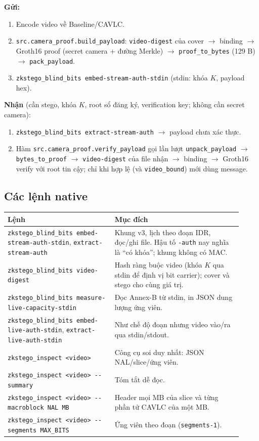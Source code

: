 \documentclass[11pt,a4paper]{article}
\begin{document}
\textbf{Gửi:}
\begin{enumerate}[leftmargin=*]
  \item Encode video về Baseline/CAVLC.
  \item \texttt{src.camera\_proof.build\_payload}: \texttt{video-digest} của cover
  \(\rightarrow\) binding \(\rightarrow\) Groth16 proof (secret camera + đường Merkle)
  \(\rightarrow\) \texttt{proof\_to\_bytes} (129 B) \(\rightarrow\) \texttt{pack\_payload}.
  \item \texttt{zkstego\_blind\_bits embed-stream-auth-stdin} (stdin: khóa \(K\), payload hex).
\end{enumerate}

\textbf{Nhận} (cần stego, khóa \(K\), root sổ đăng ký, verification key; không cần secret camera):
\begin{enumerate}[leftmargin=*]
  \item \texttt{zkstego\_blind\_bits extract-stream-auth} \(\rightarrow\) payload chưa xác thực.
  \item Hàm \texttt{src.camera\_proof.verify\_payload} gọi lần lượt
  \texttt{unpack\_payload} \(\rightarrow\) \texttt{bytes\_to\_proof} \(\rightarrow\) \texttt{video-digest} của file nhận
  \(\rightarrow\) binding \(\rightarrow\) Groth16 verify với root tin cậy; chỉ khi hợp lệ
  (và \texttt{video\_bound}) mới dùng message.
\end{enumerate}

\subsection{Các lệnh native}

\begin{center}
\small
\begin{tabular}{p{0.42\linewidth}p{0.50\linewidth}}
\toprule
Lệnh & Mục đích \\
\midrule
\texttt{zkstego\_blind\_bits embed-stream-auth-stdin}, \texttt{extract-stream-auth} & Khung v3, lịch theo đoạn IDR, đọc/ghi file. Hậu tố \texttt{-auth} nay nghĩa là ``có khóa''; khung không có MAC. \\
\texttt{zkstego\_blind\_bits video-digest} & Hash ràng buộc video (khóa \(K\) qua stdin để định vị bit carrier); cover và stego cho cùng giá trị. \\
\texttt{zkstego\_blind\_bits measure-live-capacity-stdin} & Đọc Annex-B từ stdin, in JSON dung lượng ứng viên. \\
\texttt{zkstego\_blind\_bits embed-live-auth-stdin}, \texttt{extract-live-auth-stdin} & Như chế độ đoạn nhưng video vào/ra qua stdin/stdout. \\
\texttt{zkstego\_inspect <video>} & Công cụ soi duy nhất: JSON NAL/slice/ứng viên. \\
\texttt{zkstego\_inspect <video> -{}-summary} & Tóm tắt dễ đọc. \\
\texttt{zkstego\_inspect <video> -{}-macroblock NAL MB} & Header mọi MB của slice và từng phần tử CAVLC của một MB. \\
\texttt{zkstego\_inspect <video> -{}-segments MAX\_BITS} & Ứng viên theo đoạn (\texttt{segments-1}). \\
\bottomrule
\end{tabular}
\end{center}
\end{document}
